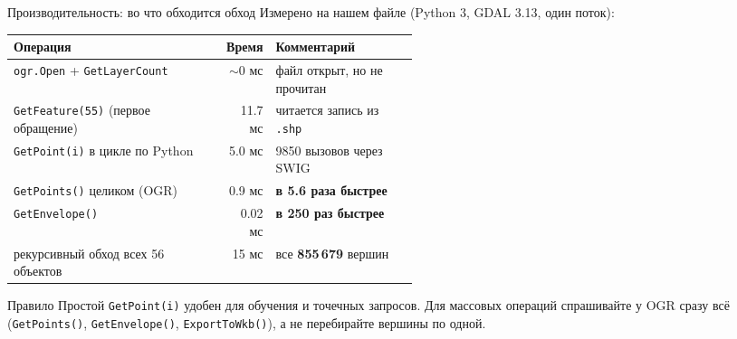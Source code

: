\documentclass[aspectratio=169,10pt]{beamer}
\newcommand{\num}[1]{\textcolor{codered}{\textbf{#1}}}
\begin{document}
\begin{frame}{Производительность: во что обходится обход}
\footnotesize
Измерено на нашем файле (Python 3, GDAL 3.13, один поток):

\vspace{0.2em}
\begin{tabular}{@{}p{0.52\linewidth}rl@{}}
  \toprule
  Операция & Время & Комментарий \\
  \midrule
  \texttt{ogr.Open} + \texttt{GetLayerCount} & $\sim$0 мс &
    файл открыт, но не прочитан \\
  \texttt{GetFeature(55)} (первое обращение) & 11.7 мс &
    читается запись из \texttt{.shp} \\
  \texttt{GetPoint(i)} в цикле по Python & 5.0 мс &
    9850 вызовов через SWIG \\
  \texttt{GetPoints()} целиком (OGR) & 0.9 мс &
    \textbf{в 5.6 раза быстрее} \\
  \texttt{GetEnvelope()} & 0.02 мс &
    \textbf{в 250 раз быстрее} \\
  \midrule
  рекурсивный обход всех 56 объектов & 15 мс &
    все \num{855\,679} вершин \\
  \bottomrule
\end{tabular}

\vspace{0.7em}
\begin{alertblock}{Правило}\small
  Простой \texttt{GetPoint(i)} удобен для обучения и точечных запросов.
  Для массовых операций спрашивайте у OGR сразу всё
  (\texttt{GetPoints()}, \texttt{GetEnvelope()}, \texttt{ExportToWkb()}),
  а не перебирайте вершины по одной.
\end{alertblock}
\end{frame}
\end{document}

